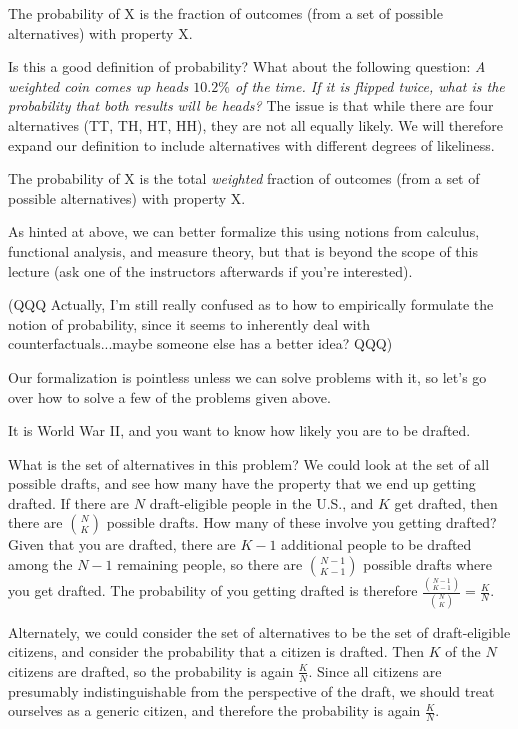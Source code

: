 \documentclass[11pt]{article}
\newenvironment{definition}[1][Definition]{\begin{trivlist}
\item[\hskip \labelsep {\bfseries #1}]}{\end{trivlist}}
\newenvironment{example}[1][Example]{\begin{trivlist}
\item[\hskip \labelsep {\bfseries #1}]}{\end{trivlist}}
\begin{document}
\begin{definition} The probability of X is the fraction of outcomes (from a set of possible alternatives) with property X. \end{definition}

Is this a good definition of probability? What about the following question: \emph{A weighted coin comes up heads $10.2 \%$ of the time. If it is flipped twice, what is the probability that both results will be heads?} The issue is that while there are four alternatives (TT, TH, HT, HH), they are not all equally likely. We will therefore expand our definition to include alternatives with different degrees of likeliness.

\begin{definition} The probability of X is the total \emph{weighted} fraction of outcomes (from a set of possible alternatives) with property X. \end{definition}

As hinted at above, we can better formalize this using notions from calculus, functional analysis, and measure theory, but that is beyond the scope of this lecture (ask one of the instructors afterwards if you're interested).

(QQQ Actually, I'm still really confused as to how to empirically formulate the notion of probability, since it seems to inherently deal with counterfactuals...maybe someone else has a better idea? QQQ)

Our formalization is pointless unless we can solve problems with it, so let's go over how to solve a few of the problems given above.

\begin{example}
It is World War II, and you want to know how likely you are to be drafted.

What is the set of alternatives in this problem? We could look at the set of all possible drafts, and see how many have the property that we end up getting drafted. If there are $N$ draft-eligible people in the U.S., and $K$ get drafted, then there are $\binom{N}{K}$ possible drafts. How many of these involve you getting drafted? Given that you are drafted, there are $K-1$ additional people to be drafted among the $N-1$ remaining people, so there are $\binom{N-1}{K-1}$ possible drafts where you get drafted. The probability of you getting drafted is therefore $\frac{\binom{N-1}{K-1}}{\binom{N}{K}} = \frac{K}{N}$.

Alternately, we could consider the set of alternatives to be the set of draft-eligible citizens, and consider the probability that a citizen is drafted. Then $K$ of the $N$ citizens are drafted, so the probability is again $\frac{K}{N}$. Since all citizens are presumably indistinguishable from the perspective of the draft, we should treat ourselves as a generic citizen, and therefore the probability is again $\frac{K}{N}$.
\end{example}
\end{document}
